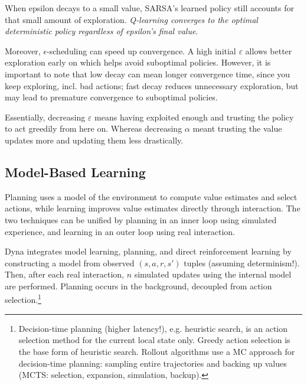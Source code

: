 \documentclass[12pt]{article}
\begin{document}
When epsilon decays to a small value, SARSA's learned policy still accounts for that small amount of exploration.
\textit{Q-learning converges to the optimal deterministic policy regardless of epsilon's final value}.

Moreover, $\epsilon$-scheduling can speed up convergence.
A high initial $\varepsilon$ allows better exploration early on which helps avoid suboptimal policies.
However, it is important to note that low decay can mean longer convergence time, since you keep exploring, incl. bad actions;
fast decay reduces unnecessary exploration, but may lead to premature convergence to suboptimal policies.

Essentially, decreasing $\varepsilon$ means having exploited enough and trusting the policy to act greedily from here on.
Whereas decreasing $\alpha$ meant trusting the value updates more and updating them less drastically.


\subsection{Model-Based Learning}

Planning uses a model of the environment to compute value estimates and select actions,
while learning improves value estimates directly through interaction.
The two techniques can be unified by planning in an inner loop using simulated experience,
and learning in an outer loop using real interaction.


Dyna integrates model learning, planning, and direct reinforcement learning
by constructing a model from observed $(s, a, r, s')$ tuples (assuming determinism!).
Then, after each real interaction, $n$ simulated updates using the internal model are performed.
Planning occurs in the background, decoupled from action selection.\footnote{
	Decision-time planning (higher latency!), e.g. heuristic search, is an action selection method for the current local state only.
	Greedy action selection is the base form of heuristic search.
	Rollout algorithms use a MC approach for decision-time planning: sampling entire trajectories and backing up values (MCTS: selection, expansion, simulation, backup).
}
\end{document}
